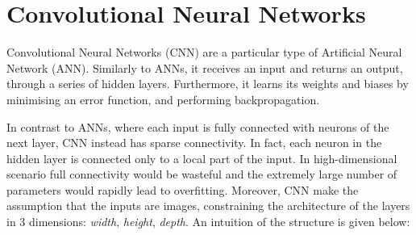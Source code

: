\section{Convolutional Neural Networks} \label{sec:cnn}
Convolutional Neural Networks (CNN) are a particular type of Artificial Neural Network (ANN). Similarly to ANNs, it receives an input and returns an output, through a series of hidden layers. Furthermore, it learns its weights and biases by minimising an error function, and performing backpropagation. 

In contrast to ANNs, where each input is fully connected with neurons of the next layer, CNN instead has sparse connectivity. In fact, each neuron in the hidden layer is connected only to a local part of the input. In high-dimensional scenario full connectivity would be wasteful and the extremely large number of parameters would rapidly lead to overfitting. Moreover, CNN make the assumption that the inputs are images, constraining the architecture of the layers in 3 dimensions: \textit{width}, \textit{height}, \textit{depth}. An intuition of the structure is given below:


